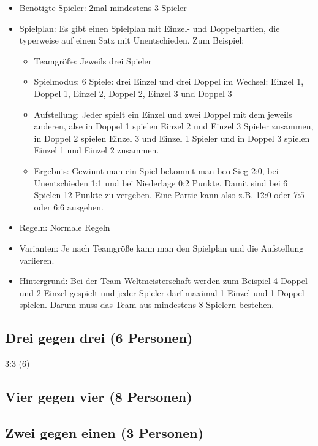 \begin{itemize}
\item Benötigte Spieler: 2mal mindestens 3 Spieler
\item Spielplan: Es gibt einen Spielplan mit Einzel- und Doppelpartien, die typerweise auf einen Satz mit Unentschieden. Zum Beispiel:
\begin{itemize}
\item Teamgröße: Jeweils drei Spieler
\item Spielmodus: 6 Spiele: drei Einzel und drei Doppel im Wechsel: Einzel 1, Doppel 1, Einzel 2, Doppel 2, Einzel 3 und Doppel 3
\item Aufstellung: Jeder spielt ein Einzel und zwei Doppel mit dem jeweils anderen, alse in Doppel 1 spielen Einzel 2 und Einzel 3 Spieler zusammen, in Doppel 2 spielen Einzel 3 und Einzel 1 Spieler und in Doppel 3 spielen Einzel 1 und Einzel 2 zusammen.  
\item Ergebnis: Gewinnt man ein Spiel bekommt man beo Sieg 2:0, bei Unentschieden 1:1 und bei Niederlage 0:2 Punkte. Damit sind bei 6 Spielen 12 Punkte zu vergeben. Eine Partie kann also z.B. 12:0 oder 7:5 oder 6:6 ausgehen. 
\end{itemize}
\item Regeln: Normale Regeln 
\item Varianten: Je nach Teamgröße kann man den Spielplan und die Aufstellung variieren. 
\item Hintergrund: Bei der Team-Weltmeisterschaft werden zum Beispiel 4 Doppel und 2 Einzel gespielt und jeder Spieler darf maximal 1 Einzel und 1 Doppel spielen. Darum muss das Team aus mindestens 8 Spielern bestehen. 
\end{itemize}
 
\subsection{Drei gegen drei (6 Personen)}
\label{spielformen:npersonen:dreigegendrei}
3:3 (6)

\subsection{Vier gegen vier (8 Personen)}
\label{spielformen:npersonen:viergegenvier}

\subsection{Zwei gegen einen (3 Personen)}
\label{spielformen:npersonen:zweigegeneinen}

